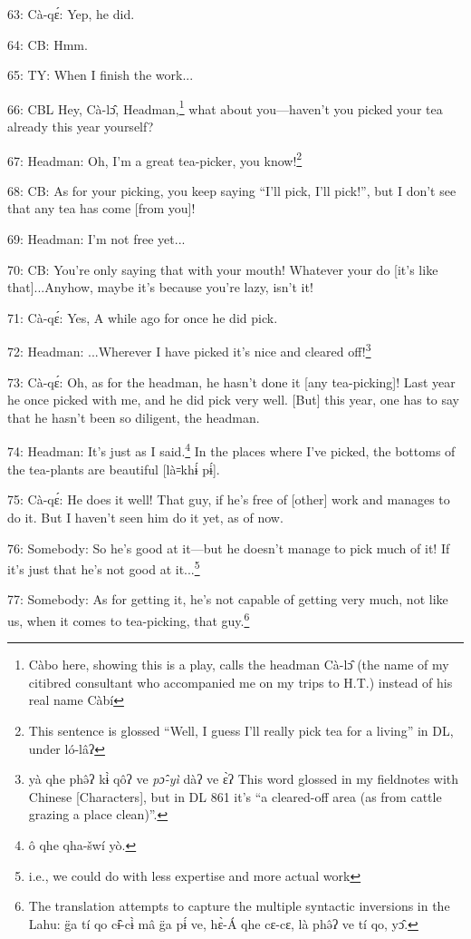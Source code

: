 63: Cà-qɛ́: Yep, he did.

64: CB: Hmm.

65: TY: When I finish the work...

66: CBL Hey, Cà-lɔ̂, Headman,\footnote{Càbo here, showing this is a play, calls the headman Cà-lɔ̂ (the name of my citibred consultant who accompanied me on my trips to H.T.) instead of his real name Càbí} what about you---haven't you picked your tea
already this year yourself?

67: Headman: Oh, I'm a great tea-picker, you know!\footnote{This sentence is glossed ``Well, I guess I'll really pick tea for a living'' in DL, under ló-lâʔ}

68: CB: As for your picking, you keep saying ``I'll pick, I'll pick!'', but I don't
see that any tea has come [from you]!

69: Headman: I'm not free yet...

70: CB: You're only saying that with your mouth! Whatever your do [it's like that]...Anyhow,
maybe it's because you're lazy, isn't it!

71: Cà-qɛ́: Yes, A while ago for once he did pick.

72: Headman: ...Wherever I have picked it's nice and cleared off!\footnote{yà qhe phə̂ʔ kɨ̀ qôʔ ve \emph{pɔ̂-yì} dàʔ ve ɛ̀ʔ  This word glossed in my fieldnotes with Chinese [Characters], but in DL 861 it's ``a cleared-off area (as from cattle grazing a place clean)''.}

73: Cà-qɛ́: Oh, as for the headman, he hasn't done it [any tea-picking]!  Last
year he once picked with me, and he did pick very well.  [But] this year, one has
to say that he hasn't been so diligent, the headman.

74: Headman: It's just as I said.\footnote{ô qhe qha-šwí yò.}  In the places where I've picked, the bottoms
of the tea-plants are beautiful [là꞊khɨ́ pɨ́].

75: Cà-qɛ́: He does it well!  That guy, if he's free of [other] work and manages
to do it.  But I haven't seen him do it yet, as of now.

76: Somebody: So he's good at it---but he doesn't manage to pick much of it!  If
it's just that he's not good at it...\footnote{i.e., we could do with less expertise and more actual work}

77: Somebody: As for getting it, he's not capable of getting very much, not like
us, when it comes to tea-picking, that guy.\footnote{The translation attempts to capture the multiple syntactic inversions in the Lahu: g̈a tí qo cɨ̂-cɨ̀ mâ g̈a pɨ́ ve, hɛ̀-Á qhe cɛ-cɛ, là phə̂ʔ ve tí qo, yɔ̂.}

